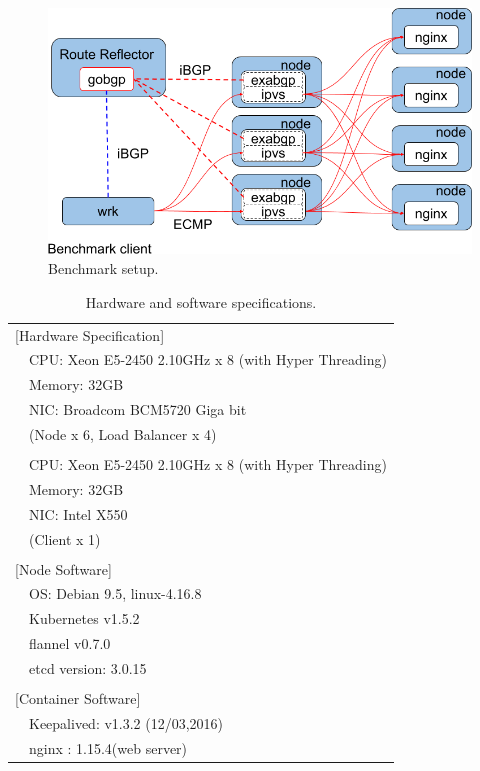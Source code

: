 \begin{figure}[h]
  \centering
  \includegraphics[width=0.9\columnwidth]{Figs/lb_ecmp_schem}

  \centering
  \begin{minipage}{0.9\columnwidth}
    \caption[Benchmark setup]{Benchmark setup.}
    \label{fig:ecmp-benchmark-schem}
  \end{minipage}
\end{figure}

{
\setlength{\tabcolsep}{1em}
\renewcommand{\arraystretch}{1.2}

\begin{table}[h]
  \centering
  \begin{tabular}{ll}
    \hline 
    \multicolumn{2}{l}{[Hardware Specification]}   \\
    & CPU: Xeon E5-2450 2.10GHz x 8 (with Hyper Threading) \\
    & Memory: 32GB \\
    & NIC: Broadcom BCM5720 Giga bit \\
    & (Node x 6, Load Balancer x 4) \\
    & \\
    & CPU: Xeon E5-2450 2.10GHz x 8 (with Hyper Threading) \\
    & Memory: 32GB \\
    & NIC: Intel X550 \\
    & (Client x 1) \\
    & \\
    \multicolumn{2}{l}{[Node Software]}  \\
    & OS: Debian 9.5, linux-4.16.8 \\
    & Kubernetes v1.5.2 \\
    & flannel v0.7.0 \\
    & etcd version: 3.0.15 \\
    & \\
    \multicolumn{2}{l}{[Container Software]}   \\
    & Keepalived: v1.3.2 (12/03,2016) \\
    & nginx : 1.15.4(web server) \\
  \hline 
  \end{tabular}
  \caption{Hardware and software specifications.}
  \label{tab:ecmp-hw_sw_spec}
\end{table}
}

